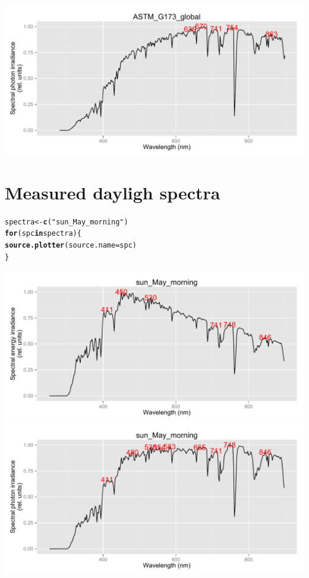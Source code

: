 \documentclass{article}\usepackage[]{graphicx}\usepackage[]{color}
\makeatletter
\newcommand{\hlstr}[1]{\textcolor[rgb]{0.192,0.494,0.8}{#1}}%
\newcommand{\hlstd}[1]{\textcolor[rgb]{0.345,0.345,0.345}{#1}}%
\newcommand{\hlkwa}[1]{\textcolor[rgb]{0.161,0.373,0.58}{\textbf{#1}}}%
\newcommand{\hlkwb}[1]{\textcolor[rgb]{0.69,0.353,0.396}{#1}}%
\newcommand{\hlkwc}[1]{\textcolor[rgb]{0.333,0.667,0.333}{#1}}%
\newcommand{\hlkwd}[1]{\textcolor[rgb]{0.737,0.353,0.396}{\textbf{#1}}}%
\newenvironment{kframe}{%
 \def\at@end@of@kframe{}%
 \ifinner\ifhmode%
  \def\at@end@of@kframe{\end{minipage}}%
  \begin{minipage}{\columnwidth}%
 \fi\fi%
 \def\FrameCommand##1{\hskip\@totalleftmargin \hskip-\fboxsep
 \colorbox{shadecolor}{##1}\hskip-\fboxsep
     \hskip-\linewidth \hskip-\@totalleftmargin \hskip\columnwidth}%
 \MakeFramed {\advance\hsize-\width
   \@totalleftmargin\z@ \linewidth\hsize
   \@setminipage}}%
 {\par\unskip\endMakeFramed%
 \at@end@of@kframe}
\newenvironment{knitrout}{}{} %
\makeatother
\begin{document}
\begin{knitrout}
{\includegraphics[width=.95\textwidth]{figure/pos-terrestrial-std4} 

}



\end{knitrout}


\section{Measured dayligh spectra}

\begin{knitrout}\footnotesize
{}\color{fgcolor}\begin{kframe}
\begin{alltt}
\hlstd{spectra} \hlkwb{<-} \hlkwd{c}\hlstd{(}\hlstr{"sun_May_morning"}\hlstd{)}
\hlkwa{for} \hlstd{(spc} \hlkwa{in} \hlstd{spectra) \{}
    \hlkwd{source.plotter}\hlstd{(}\hlkwc{source.name} \hlstd{= spc)}
\hlstd{\}}
\end{alltt}
\end{kframe}

{\centering \includegraphics[width=.95\textwidth]{figure/pos-terrestrial-meas1} 
\includegraphics[width=.95\textwidth]{figure/pos-terrestrial-meas2} 

}



\end{knitrout}
\end{document}

